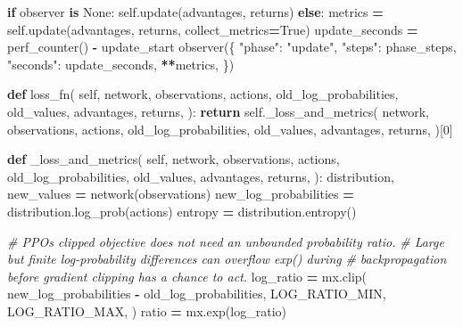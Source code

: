 \documentclass[
  chinese,
  11pt,
  letterpaper,
]{article}
\newenvironment{Shaded}{\begin{snugshade}}{\end{snugshade}}
\newcommand{\CommentTok}[1]{\textcolor[rgb]{0.56,0.35,0.01}{\textit{#1}}}
\newcommand{\ControlFlowTok}[1]{\textcolor[rgb]{0.13,0.29,0.53}{\textbf{#1}}}
\newcommand{\DecValTok}[1]{\textcolor[rgb]{0.00,0.00,0.81}{#1}}
\newcommand{\KeywordTok}[1]{\textcolor[rgb]{0.13,0.29,0.53}{\textbf{#1}}}
\newcommand{\NormalTok}[1]{#1}
\newcommand{\OperatorTok}[1]{\textcolor[rgb]{0.81,0.36,0.00}{\textbf{#1}}}
\newcommand{\StringTok}[1]{\textcolor[rgb]{0.31,0.60,0.02}{#1}}
\newcommand{\VariableTok}[1]{\textcolor[rgb]{0.00,0.00,0.00}{#1}}
\renewenvironment{Shaded}{\par\smallskip}{\par\smallskip}
\begin{document}
\begin{Shaded}
\begin{Highlighting}[]
            \ControlFlowTok{if}\NormalTok{ observer }\KeywordTok{is} \VariableTok{None}\NormalTok{:}
                \VariableTok{self}\NormalTok{.update(advantages, returns)}
            \ControlFlowTok{else}\NormalTok{:}
\NormalTok{                metrics }\OperatorTok{=} \VariableTok{self}\NormalTok{.update(advantages, returns, collect\_metrics}\OperatorTok{=}\VariableTok{True}\NormalTok{)}
\NormalTok{                update\_seconds }\OperatorTok{=}\NormalTok{ perf\_counter() }\OperatorTok{{-}}\NormalTok{ update\_start}
\NormalTok{                observer(\{}
                    \StringTok{"phase"}\NormalTok{: }\StringTok{"update"}\NormalTok{,}
                    \StringTok{"steps"}\NormalTok{: phase\_steps,}
                    \StringTok{"seconds"}\NormalTok{: update\_seconds,}
                    \OperatorTok{**}\NormalTok{metrics,}
\NormalTok{                \})}

    \KeywordTok{def}\NormalTok{ loss\_fn(}
        \VariableTok{self}\NormalTok{,}
\NormalTok{        network,}
\NormalTok{        observations,}
\NormalTok{        actions,}
\NormalTok{        old\_log\_probabilities,}
\NormalTok{        old\_values,}
\NormalTok{        advantages,}
\NormalTok{        returns,}
\NormalTok{    ):}
        \ControlFlowTok{return} \VariableTok{self}\NormalTok{.\_loss\_and\_metrics(}
\NormalTok{            network,}
\NormalTok{            observations,}
\NormalTok{            actions,}
\NormalTok{            old\_log\_probabilities,}
\NormalTok{            old\_values,}
\NormalTok{            advantages,}
\NormalTok{            returns,}
\NormalTok{        )[}\DecValTok{0}\NormalTok{]}

    \KeywordTok{def}\NormalTok{ \_loss\_and\_metrics(}
        \VariableTok{self}\NormalTok{,}
\NormalTok{        network,}
\NormalTok{        observations,}
\NormalTok{        actions,}
\NormalTok{        old\_log\_probabilities,}
\NormalTok{        old\_values,}
\NormalTok{        advantages,}
\NormalTok{        returns,}
\NormalTok{    ):}
\NormalTok{        distribution, new\_values }\OperatorTok{=}\NormalTok{ network(observations)}
\NormalTok{        new\_log\_probabilities }\OperatorTok{=}\NormalTok{ distribution.log\_prob(actions)}
\NormalTok{        entropy }\OperatorTok{=}\NormalTok{ distribution.entropy()}

        \CommentTok{\# PPO\textquotesingle{}s clipped objective does not need an unbounded probability ratio.}
        \CommentTok{\# Large but finite log{-}probability differences can overflow exp() during}
        \CommentTok{\# backpropagation before gradient clipping has a chance to act.}
\NormalTok{        log\_ratio }\OperatorTok{=}\NormalTok{ mx.clip(}
\NormalTok{            new\_log\_probabilities }\OperatorTok{{-}}\NormalTok{ old\_log\_probabilities,}
\NormalTok{            LOG\_RATIO\_MIN,}
\NormalTok{            LOG\_RATIO\_MAX,}
\NormalTok{        )}
\NormalTok{        ratio }\OperatorTok{=}\NormalTok{ mx.exp(log\_ratio)}


\end{Highlighting}
\end{Shaded}
\end{document}
